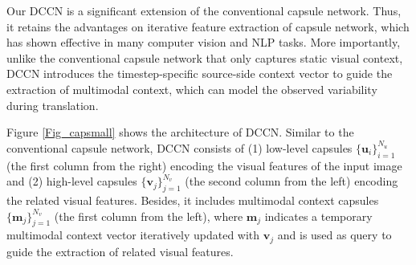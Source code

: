 \documentclass[sigconf]{acmart}
\begin{document}
Our DCCN is a significant extension of the conventional capsule network. 
Thus, it retains the advantages on iterative feature extraction of capsule network, 
which has shown effective in many computer vision  \cite{DBLP:conf/iclr/XinyiC19,DBLP:conf/eccv/LiGDOW18,DBLP:conf/iccv/SinghN0V19,DBLP:journals/spl/XiangZTZX18,DBLP:conf/eccv/JaiswalA0N18,DBLP:journals/corr/abs-1812-00303} and NLP \cite{DBLP:conf/iclr/XinyiC19,chen2019transfer,yang-etal-2018-investigating,aly2019hierarchical,DBLP:conf/emnlp/YangZMGFZ19,DBLP:conf/emnlp/ZhengHTDC19,DBLP:conf/emnlp/Wang19} tasks. 
More importantly, unlike the conventional capsule network that only captures static visual context, DCCN introduces the timestep-specific source-side context vector to guide the extraction of multimodal context, which can model the observed variability during translation.


Figure \ref{Fig_capsmall} shows the architecture of DCCN. 
Similar to the conventional capsule network, DCCN consists of 
(1) low-level capsules $\{\mathbf{u}_i\}_{i=1}^{N_u}$ (the first column from the right) encoding the visual features of the input image and 
(2) high-level capsules $\{\mathbf{v}_j\}_{j=1}^{N_v}$ (the second column from the left) encoding the related visual features. 
Besides, it includes multimodal context capsules $\{\mathbf{m}_j\}_{j=1}^{N_v}$ (the first column from the left), where $\mathbf{m}_j$ indicates a temporary multimodal context vector iteratively updated with $\mathbf{v}_j$ and is used as query to guide the extraction of related visual features. 
\end{document}
